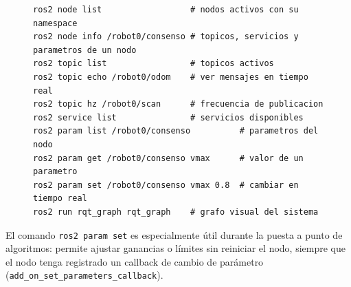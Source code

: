 \begin{figure}[H]
\centering
\begin{lstlisting}[style=bash, caption={Comandos fundamentales de la CLI de ROS~2.}, label={lst:ros2_cli_full}]
ros2 node list                  # nodos activos con su namespace
ros2 node info /robot0/consenso # topicos, servicios y parametros de un nodo
ros2 topic list                 # topicos activos
ros2 topic echo /robot0/odom    # ver mensajes en tiempo real
ros2 topic hz /robot0/scan      # frecuencia de publicacion
ros2 service list               # servicios disponibles
ros2 param list /robot0/consenso          # parametros del nodo
ros2 param get /robot0/consenso vmax      # valor de un parametro
ros2 param set /robot0/consenso vmax 0.8  # cambiar en tiempo real
ros2 run rqt_graph rqt_graph    # grafo visual del sistema
\end{lstlisting}
\end{figure}

El comando \texttt{ros2 param set} es especialmente útil durante la puesta a punto de algoritmos: permite ajustar ganancias o límites sin reiniciar el nodo, siempre que el nodo tenga registrado un callback de cambio de parámetro (\texttt{add\_on\_set\_parameters\_callback}).

